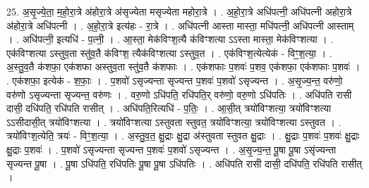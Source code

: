 \documentclass[17pt]{extarticle}
\begin{document}
25. अ॒सृ॒ज्ये॒ता॒ म॒हो॒रा॒त्रे अ॑होरा॒त्रे अ॑सृज्येता मसृज्येता महोरा॒त्रे । . अ॒हो॒रा॒त्रे अधि॑पत्नी॒ अधि॑पत्नी अहोरा॒त्रे अ॑होरा॒त्रे अधि॑पत्नी । . अ॒हो॒रा॒त्रे इत्य॑हः - रा॒त्रे । . अधि॑पत्नी आस्ता मास्ता॒ मधि॑पत्नी॒ अधि॑पत्नी आस्ताम् । . अधि॑पत्नी॒ इत्यधि॑ - प॒त्नी॒ । . आ॒स्ता॒ मेक॑विꣳश॒त्यै क॑विꣳशत्या ऽऽस्ता मास्ता॒ मेक॑विꣳशत्या । . एक॑विꣳशत्या ऽस्तुव॒ता स्तु॑व॒तै क॑विꣳश॒ त्यैक॑विꣳशत्या ऽस्तुव॒त । . एक॑विꣳश॒त्येत्येक॑ - विꣳ॒॒श॒त्या॒ । . अ॒स्तु॒व॒तै क॑शफा॒ एक॑शफा अस्तुव॒ता स्तु॑व॒तै क॑शफाः । . एक॑शफाः प॒शवः॑ प॒शव॒ एक॑शफा॒ एक॑शफाः प॒शवः॑ । . एक॑शफा॒ इत्येक॑ - श॒फाः॒ । . प॒शवो॑ ऽसृज्यन्ता सृज्यन्त प॒शवः॑ प॒शवो॑ ऽसृज्यन्त । . अ॒सृ॒ज्य॒न्त॒ वरु॑णो॒ वरु॑णो ऽसृज्यन्ता सृज्यन्त॒ वरु॑णः । . वरु॒णो ऽधि॑पति॒ रधि॑पति॒र् वरु॑णो॒ वरु॒णो ऽधि॑पतिः । . अधि॑पति रासी दासी॒ दधि॑पति॒ रधि॑पति रासीत् । . अधि॑पति॒रित्यधि॑ - प॒तिः॒ । . आ॒सी॒त् त्रयो॑विꣳशत्या॒ त्रयो॑विꣳशत्या ऽऽसीदासी॒त् त्रयो॑विꣳशत्या । . त्रयो॑विꣳशत्या ऽस्तुवता स्तुवत॒ त्रयो॑विꣳशत्या॒ त्रयो॑विꣳशत्या ऽस्तुवत । . त्रयो॑विꣳश॒त्येति॒ त्रयः॑ - विꣳ॒॒श॒त्या॒ । . अ॒स्तु॒व॒त॒ क्षु॒द्राः क्षु॒द्रा अ॑स्तुवता स्तुवत क्षु॒द्राः । . क्षु॒द्राः प॒शवः॑ प॒शवः॑ क्षु॒द्राः क्षु॒द्राः प॒शवः॑ । . प॒शवो॑ ऽसृज्यन्ता सृज्यन्त प॒शवः॑ प॒शवो॑ ऽसृज्यन्त । . अ॒सृ॒ज्य॒न्त॒ पू॒षा पू॒षा ऽसृ॑ज्यन्ता सृज्यन्त पू॒षा । . पू॒षा ऽधि॑पति॒ रधि॑पतिः पू॒षा पू॒षा ऽधि॑पतिः । . अधि॑पति रासी दासी॒ दधि॑पति॒ रधि॑पति रासीत् । \newline
\end{document}
